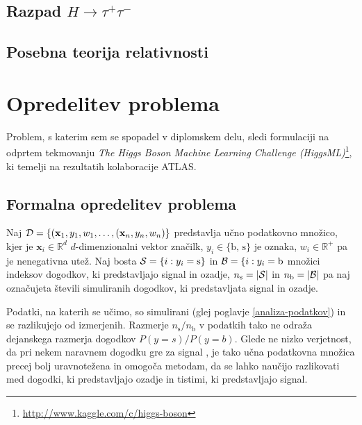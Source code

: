 \documentclass[11pt,a4paper,openany]{book}
\begin{document}
\section{Razpad $H \rightarrow \tau^+\tau^-$}

\cite{Baldi2014} \cite{atlas2013}


\section{Posebna teorija relativnosti}

\chapter{Opredelitev problema}

Problem, s katerim sem se spopadel v diplomskem delu, sledi formulaciji na odprtem tekmovanju \textit{The Higgs Boson Machine Learning Challenge (HiggsML)}\footnote{ \url{http://www.kaggle.com/c/higgs-boson}}, ki temelji na rezultatih kolaboracije ATLAS\cite{Adam-Bourdarios14}. 


\section{Formalna opredelitev problema}

Naj ${\cal D} = \left\{({\mathbf x}_1, y_1, w_1, \dots, ({\mathbf x}_n, y_n, w_n) \right\}$ predstavlja učno podatkovno množico, kjer je $\mathbf{x}_i \in \mathbb{R}^d$ $d$-dimenzionalni vektor značilk, $y_i \in \{\text{b, s}\}$ je oznaka, $w_i \in \mathbb{R}^+$ pa je nenegativna utež. Naj bosta ${\cal S} = \{i : y_i = \text{s}\}$ in ${\cal B} = \{i : y_i = \text{b}$ množici indeksov dogodkov, ki predstavljajo signal in ozadje, $n_\text{s} = |{\cal S}|$ in $n_\text{b} = |{\cal B}|$ pa naj označujeta števili simuliranih dogodkov, ki predstavljata signal in ozadje.

Podatki, na katerih se učimo, so simulirani (glej poglavje \ref{analiza-podatkov}) in se razlikujejo od izmerjenih. Razmerje $n_\text{s} / n_\text{b}$ v podatkih tako ne odraža dejanskega razmerja dogodkov $P(y = s) / P(y = b)$. Glede ne nizko verjetnost, da pri nekem naravnem dogodku gre za signal \cite{Adam-Bourdarios14}, je tako učna podatkovna množica precej bolj uravnotežena in omogoča metodam, da se lahko naučijo razlikovati med dogodki, ki predstavljajo ozadje in tistimi, ki predstavljajo signal.
\end{document}
